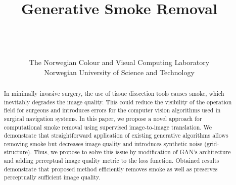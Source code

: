 \documentclass[pmlr]{jmlr}
\title[Generative Smoke Removal]{Generative Smoke Removal}
\author{\Name{Oleksii Sidorov} \Email{oleksiis@fb.com}\\
           \Name{Congcong Wang} \Email{congcong.wang@ntnu.no}\\
            \Name{Faouzi Alaya Cheikh} \Email{faouzi.cheikh@ntnu.no}\\
           \addr The Norwegian Colour and Visual Computing Laboratory\\
                 Norwegian University of Science and Technology
                 }
\begin{document}
\maketitle

\begin{abstract}
In minimally invasive surgery, the use of tissue dissection tools causes smoke, which inevitably degrades the image quality. This could reduce the visibility of the operation field for surgeons and introduces errors for the computer vision algorithms used in surgical navigation systems. In this paper, we propose a novel approach for computational smoke removal using supervised image-to-image translation. We demonstrate that straightforward application of existing generative algorithms allows removing smoke but decreases image quality and introduces synthetic noise (grid-structure). Thus, we propose to solve this issue by modification of GAN’s architecture and adding perceptual image quality metric to the loss function. Obtained results demonstrate that proposed method efficiently removes smoke as well as preserves perceptually sufficient image quality.
\end{abstract}
\end{document}
